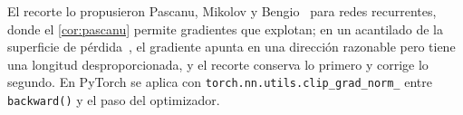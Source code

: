 \addtocounter{definicion}{1}%

El recorte lo propusieron Pascanu, Mikolov y Bengio~\cite[§3.2]{pascanu} para redes recurrentes, donde el \cref{cor:pascanu} permite gradientes que explotan; en un acantilado de la superficie de pérdida~\cite[§8.2.4]{gbc}, el gradiente apunta en una dirección razonable pero tiene una longitud desproporcionada, y el recorte conserva lo primero y corrige lo segundo. En PyTorch se aplica con \texttt{torch.nn.utils.clip\_grad\_norm\_} entre \texttt{backward()} y el paso del optimizador.

\addtocounter{definicion}{1}%

